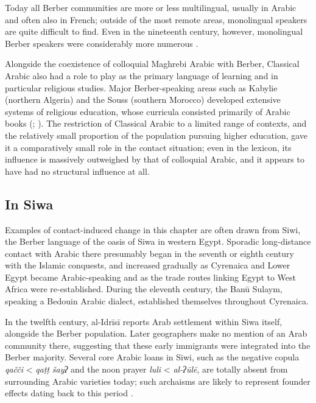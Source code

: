 \documentclass[output=paper]{langsci/langscibook}
\begin{document}
Today all Berber communities are more or less multilingual, usually in Arabic and often also in French; outside of the most remote areas, monolingual speakers are quite difficult to find. Even in the nineteenth century, however, monolingual Berber speakers were considerably more numerous \citep[41]{Kossmann2013book}.

Alongside the coexistence of colloquial Maghrebi Arabic with Berber, Classical Arabic also had a role to play as the primary language of learning and in particular religious studies.  Major Berber-speaking areas such as Kabylie (northern Algeria) and the Souss (southern Morocco) developed extensive systems of religious education, whose curricula consisted primarily of Arabic books (\citealt{Boogert1997}; \citealt{Mechehed2007}). The restriction of Classical Arabic to a limited range of contexts, and the relatively small proportion of the population pursuing higher education, gave it a comparatively small role in the contact situation; even in the lexicon, its influence is massively outweighed by that of colloquial Arabic, and it appears to have had no structural influence at all.


 
 \subsection{In Siwa}


Examples of contact-induced change in this chapter are often drawn from Siwi, the Berber language of the oasis of Siwa in western Egypt. Sporadic long-distance contact with Arabic there presumably began in the seventh or eighth century with the Islamic conquests, and increased gradually as Cyrenaica and Lower Egypt became Arabic-speaking and as the trade routes linking Egypt to West Africa were re-established.  During the eleventh century, the Banū Sulaym, speaking a Bedouin Arabic dialect, established themselves throughout Cyrenaica.

In the twelfth century, al-Idrīsī reports Arab settlement within Siwa itself, alongside the Berber population. Later geographers make no mention of an Arab community there, suggesting that these early immigrants were integrated into the Berber majority. Several core Arabic loans in Siwi, such as the negative copula \textit{qačči} < \textit{qaṭṭ} \textit{šayʔ} and the noon prayer \textit{luli} < \textit{al-ʔūlē}, are totally absent from surrounding Arabic varieties today; such archaisms are likely to represent founder effects dating back to this period \citep{Souag2009}.  
\end{document}
